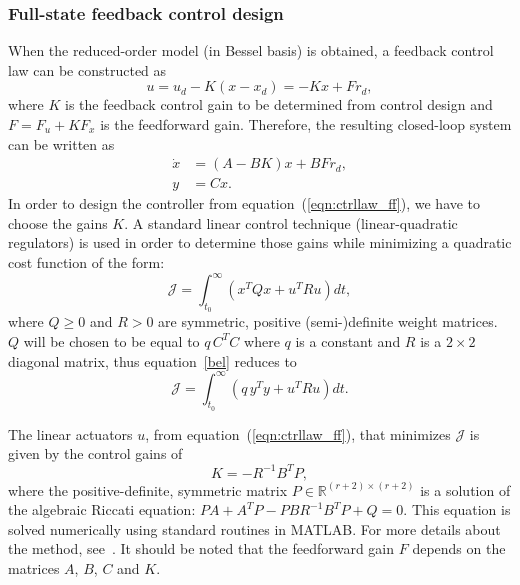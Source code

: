 \documentclass{iopart}
\begin{document}
\subsubsection{Full-state feedback control design} 

When the reduced-order model (in Bessel basis) is obtained, a feedback control law can be constructed as
\begin{equation}
   u = u_{d} - K(x - x_{d}) = - Kx + Fr_{d},
   \label{eqn:ctrllaw_ff}
\end{equation}
where $K$ is the feedback control gain to be determined from control design and $F = F_u + K F_x$ is the feedforward gain.  Therefore, the resulting closed-loop system can be written as
\begin{align}
      \dot{x} &= (A-BK) x + BF r_{d}, \\
      y &= C x.
\end{align}
In order to design the controller from equation~(\ref{eqn:ctrllaw_ff}), we have to choose the gains $K$.
A  standard linear control technique (linear-quadratic regulators) is used in order to determine those gains while minimizing a quadratic cost function of the form:
\begin{equation}
 \mathcal{J} = \int_{t_0}^\infty \left( x^T Q x + u^T R u \right) dt,
 \label{bel}
\end{equation}
where $Q\ge 0$ and $R>0$ are symmetric, positive (semi-)definite weight matrices. $Q$ will be chosen to be equal to $q \, C^{T} C$ where $q$ is a constant and $R$ is a $2 \times 2$ diagonal matrix, thus equation~\ref{bel} reduces to
\begin{equation}
   \mathcal{J} = \int_{t_0}^\infty \left( q \, y^T y + u^T R u \right) dt.
\end{equation}

 
The linear actuators $u$, from equation~(\ref{eqn:ctrllaw_ff}), that minimizes $\mathcal{J}$ is given by the control gains of
\begin{equation}
   K  = - R^{-1} B^T P,
\end{equation}
where the positive-definite, symmetric matrix $P \in \mathbb{R}^{(r+2) \times (r+2)}$ is a solution of the algebraic Riccati equation: $P {A} + {A}^T P - P {B} R^{-1} B^T P + Q = 0$.  This equation is solved numerically using standard routines in MATLAB. For more details about the method, see~\cite{SandP, AandM, Stengel}.
It should be noted that the feedforward gain $F$  depends on the matrices $A$, $B$, $C$ and $K$.
\end{document}
